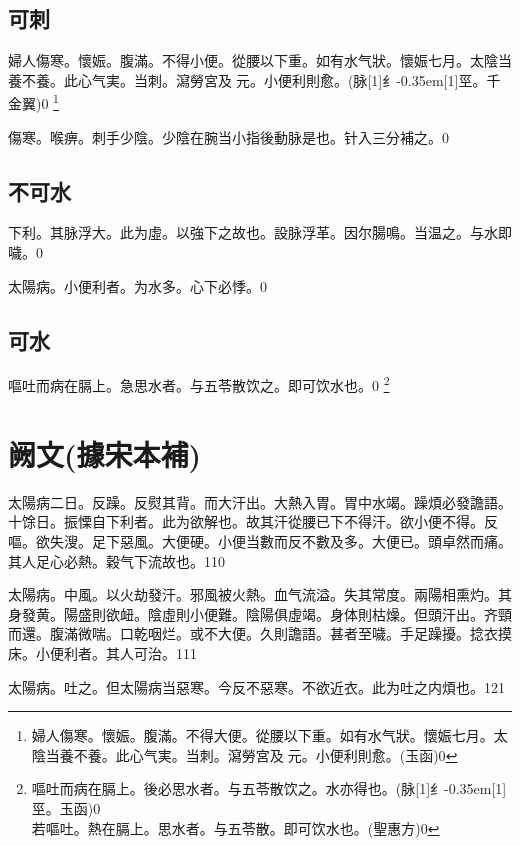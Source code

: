 \documentclass[oneside,b4paper]{ctexbook}
\begin{document}
\begin{flushleft}
\section{可刺}

婦人傷寒。懷娠。腹滿。不得小便。從腰以下重。如有水气狀。懷娠七月。太陰当養不養。此心气実。当刺。瀉勞宮及{𬮦}元。小便利則愈。(脉{\hbox{\scalebox{0.68}[1]{纟}\kern-0.35em\scalebox{0.64}[1]{巠}}}。千金翼)0
\footnote{婦人傷寒。懷娠。腹滿。不得大便。從腰以下重。如有水气狀。懷娠七月。太陰当養不養。此心气実。当刺。瀉勞宮及{𬮦}元。小便利則愈。(玉函)0}

傷寒。喉痹。刺手少陰。少陰在腕当小指後動脉是也。针入三分補之。0

\section{不可水}

下利。其脉浮大。此为虛。以強下之故也。設脉浮革。因尔腸鳴。当温之。与水即噦。0

太陽病。小便利者。为水多。心下必悸。0

\section{可水}

嘔吐而病在膈上。急思水者。与五苓散饮之。即可饮水也。0
\footnote{嘔吐而病在膈上。後必思水者。与五苓散饮之。水亦得也。(脉{\hbox{\scalebox{0.68}[1]{纟}\kern-0.35em\scalebox{0.64}[1]{巠}}}。玉函)0\\若嘔吐。熱在膈上。思水者。与五苓散。即可饮水也。(聖惠方)0}

\chapter{阙文(據宋本補)}

太陽病二日。反躁。反熨其背。而大汗出。大熱入胃。胃中水竭。躁煩必發譫語。十馀日。振慄自下利者。此为欲解也。故其汗從腰已下不得汗。欲小便不得。反嘔。欲失溲。足下惡風。大便硬。小便当數而反不數及多。大便已。頭卓然而痛。其人足心必熱。穀气下流故也。110

太陽病。中風。以火劫發汗。邪風被火熱。血气流溢。失其常度。兩陽相熏灼。其身發黄。陽盛則欲衄。陰虛則小便難。陰陽俱虛竭。身体則枯燥。但頭汗出。齐頸而還。腹滿微喘。口乾咽烂。或不大便。久則譫語。甚者至噦。手足躁擾。捻衣摸床。小便利者。其人可治。111

太陽病。吐之。但太陽病当惡寒。今反不惡寒。不欲近衣。此为吐之内煩也。121


\end{flushleft}
\end{document}

